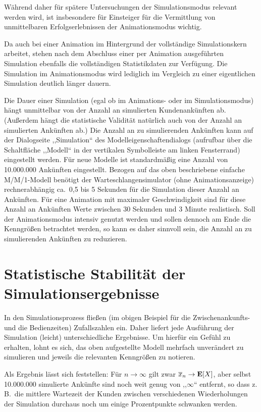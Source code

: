 \documentclass[deutsch]{svmono}
\begin{document}
Während daher für spätere Untersuchungen der Simulationsmodus relevant werden wird, ist insbesondere für Einsteiger für die Vermittlung von unmittelbaren Erfolgserlebnissen der Animationsmodus wichtig.

Da auch bei einer Animation im Hintergrund der vollständige Simulationskern arbeitet, stehen nach dem Abschluss einer per Animation ausgeführten Simulation ebenfalls die vollständigen Statistikdaten zur Verfügung. Die Simulation im Animationsmodus wird lediglich im Vergleich zu einer eigentlichen Simulation deutlich länger dauern.

Die Dauer einer Simulation (egal ob im Animations- oder im Simulationsmodus) hängt unmittelbar von der Anzahl an simulierten Kundenankünften ab. (Außerdem hängt die statistische Validität natürlich auch von der Anzahl an simulierten Ankünften ab.) Die Anzahl an zu simulierenden Ankünften kann auf der Dialogseite ,,Simulation`` des Modelleigenschaftendialogs (aufrufbar über die Schaltfläche ,,Modell`` in der vertikalen Symbolleiste am linken Fensterrand) eingestellt werden. Für neue Modelle ist standardmäßig eine Anzahl von 10.000.000 Ankünften eingestellt. Bezogen auf das oben beschriebene einfache M/M/1-Modell benötigt der Warteschlangensimulator (ohne Animationsanzeige) rechnerabhängig ca.\ 0{,}5 bis 5 Sekunden für die Simulation dieser Anzahl an Ankünften. Für eine Animation mit maximaler Geschwindigkeit sind für diese Anzahl an Ankünften Werte zwischen 30 Sekunden und 3 Minute realistisch. Soll der Animationsmodus intensiv genutzt werden und sollen dennoch am Ende die Kenngrößen betrachtet werden, so kann es daher sinnvoll sein, die Anzahl an zu simulierenden Ankünften zu reduzieren.



\section{Statistische Stabilität der Simulationsergebnisse}

In den Simulationsprozess fließen (im obigen Beispiel für die Zwischenankunfts- und die Bedienzeiten) Zufallszahlen ein. Daher liefert jede Ausführung der Simulation (leicht) unterschiedliche Ergebnisse. Um hierfür ein Gefühl zu erhalten, lohnt es sich, das oben aufgestellte Modell mehrfach unverändert zu simulieren und jeweils die relevanten Kenngrößen zu notieren.

Als Ergebnis lässt sich feststellen: Für $n\to\infty$ gilt zwar $\overline{x}_n\to{\bf E}[X]$, aber selbst 10.000.000 simulierte Ankünfte sind noch weit genug von ,,$\infty$`` entfernt, so dass z.\,B.\ die mittlere Wartezeit der Kunden zwischen verschiedenen Wiederholungen der Simulation durchaus noch um einige Prozentpunkte schwanken werden.
\end{document}
